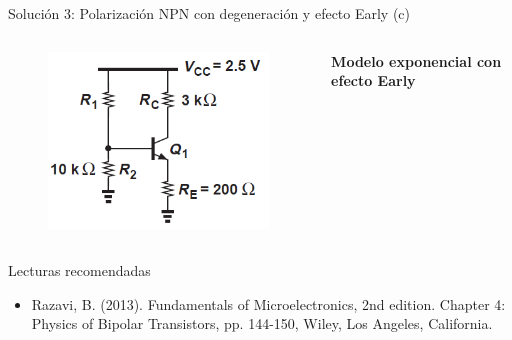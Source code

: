 \documentclass[t,aspectratio=169]{beamer}
\begin{document}
\begin{frame}{Solución 3: Polarización NPN con degeneración y efecto Early (c)}

\begin{columns}
\begin{column}{0.35\textwidth}

\begin{figure}[H]
    \flushleft
    \includegraphics[width=\textwidth]{figuras/efecto_early_ejemplo_3.png}
\end{figure}

\end{column}
\begin{column}{0.65\textwidth}

\textbf{Modelo exponencial con efecto Early}

\end{column}
\end{columns}
    
\end{frame}


\begin{frame}{Lecturas recomendadas}

\begin{itemize}
    \item Razavi, B. (2013). Fundamentals of Microelectronics, 2nd edition. Chapter 4: Physics of Bipolar Transistors, pp. 144-150, Wiley, Los Angeles, California.
\end{itemize}

\end{frame}
\end{document}
